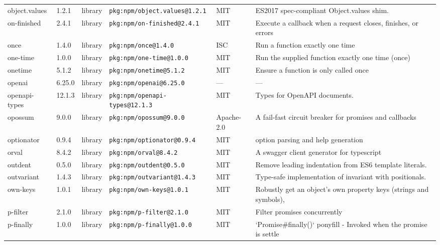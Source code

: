 \documentclass[11pt,a4paper]{article}
\begin{document}
\begin{longtable}{|p{4cm}|p{2cm}|p{1.6cm}|p{5cm}|p{1.5cm}|p{3.5cm}|}
\raggedright object.values & 1.2.1 & library & \small\texttt{pkg:npm/object.values@1.2.1} & MIT & \small ES2017 spec-compliant Object.values shim. \\
\raggedright on-finished & 2.4.1 & library & \small\texttt{pkg:npm/on-finished@2.4.1} & MIT & \small Execute a callback when a request closes, finishes, or errors \\
\raggedright once & 1.4.0 & library & \small\texttt{pkg:npm/once@1.4.0} & ISC & \small Run a function exactly one time \\
\raggedright one-time & 1.0.0 & library & \small\texttt{pkg:npm/one-time@1.0.0} & MIT & \small Run the supplied function exactly one time (once) \\
\raggedright onetime & 5.1.2 & library & \small\texttt{pkg:npm/onetime@5.1.2} & MIT & \small Ensure a function is only called once \\
\raggedright openai & 6.25.0 & library & \small\texttt{pkg:npm/openai@6.25.0} & — & \small — \\
\raggedright openapi-types & 12.1.3 & library & \small\texttt{pkg:npm/openapi-types@12.1.3} & MIT & \small Types for OpenAPI documents. \\
\raggedright opossum & 9.0.0 & library & \small\texttt{pkg:npm/opossum@9.0.0} & Apache-2.0 & \small A fail-fast circuit breaker for promises and callbacks \\
\raggedright optionator & 0.9.4 & library & \small\texttt{pkg:npm/optionator@0.9.4} & MIT & \small option parsing and help generation \\
\raggedright orval & 8.4.2 & library & \small\texttt{pkg:npm/orval@8.4.2} & MIT & \small A swagger client generator for typescript \\
\raggedright outdent & 0.5.0 & library & \small\texttt{pkg:npm/outdent@0.5.0} & MIT & \small Remove leading indentation from ES6 template literals. \\
\raggedright outvariant & 1.4.3 & library & \small\texttt{pkg:npm/outvariant@1.4.3} & MIT & \small Type-safe implementation of invariant with positionals. \\
\raggedright own-keys & 1.0.1 & library & \small\texttt{pkg:npm/own-keys@1.0.1} & MIT & \small Robustly get an object's own property keys (strings and symbols), \\
\raggedright p-filter & 2.1.0 & library & \small\texttt{pkg:npm/p-filter@2.1.0} & MIT & \small Filter promises concurrently \\
\raggedright p-finally & 1.0.0 & library & \small\texttt{pkg:npm/p-finally@1.0.0} & MIT & \small `Promise\#finally()` ponyfill - Invoked when the promise is settle \\

\end{longtable}
\end{document}
